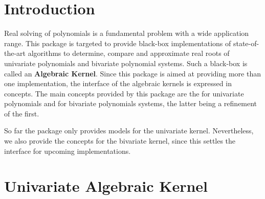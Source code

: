 
\section{Introduction}
Real solving of polynomials is a fundamental problem with a wide application range. 
This package is targeted to provide black-box implementations of state-of-the-art 
algorithms to determine, compare and approximate real roots of univariate polynomials
and bivariate polynomial systems. Such a black-box is called an {\bf Algebraic Kernel}. 
Since this package is aimed at providing more than one implementation, the interface of the algebraic kernels 
is expressed in concepts. The main concepts provided by this package are the 
 for univariate polynomials and  
for bivariate polynomials systems, the latter being a refinement of the first. 

So far the package only provides models for the univariate kernel. Nevertheless, 
we also provide the concepts for the bivariate kernel, since this settles the interface
for upcoming implementations.


\section{Univariate Algebraic Kernel}
